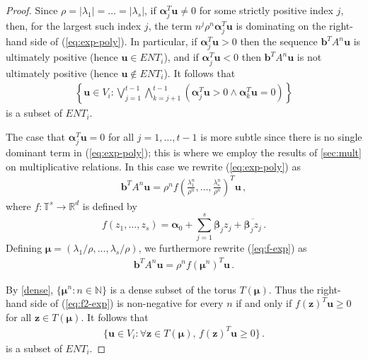 \begin{proof}
Since $\rho=|\lambda_1|=\ldots=|\lambda_s|$, if
$\boldsymbol{\alpha}_j^T\boldsymbol{u}\neq 0$ for some strictly
positive index $j$, then, for the largest such index $j$, the term
$n^{j}\rho^n\boldsymbol{\alpha}_{j}^T\boldsymbol{u}$ is
dominating on the right-hand side of (\ref{eq:exp-poly}).  In
particular, if $\boldsymbol{\alpha}_{j}^T\boldsymbol{u}>0$ then the
sequence $\boldsymbol{b}^TA^n\boldsymbol{u}$ is ultimately positive
(hence $\boldsymbol{u}\in \mathit{ENT}_i$), and if
$\boldsymbol{\alpha}_{j}^T\boldsymbol{u}<0$ then
$\boldsymbol{b}^TA^n\boldsymbol{u}$ is not ultimately positive (hence
$\boldsymbol{u}\not\in\mathit{ENT}_i$).  It follows that
\begin{gather}
\left\{ \boldsymbol{u} \in V_i : \bigvee_{j=1}^{t-1}\bigwedge_{k=j+1}^{t-1}
(\boldsymbol{\alpha}_j^T \boldsymbol{u}>0 \wedge
\boldsymbol{\alpha}_k^T \boldsymbol{u}=0) \right\}
\label{eq:ENT1}
\end{gather}
is a subset of $\mathit{ENT}_i$.

The case that $\boldsymbol{\alpha}_j^T\boldsymbol{u}=0$ for all
$j=1,\ldots,t-1$ is more subtle since there is no single dominant term
in (\ref{eq:exp-poly}); this is where we employ the results of
\cref{sec:mult} on multiplicative relations. In this case we
rewrite (\ref{eq:exp-poly}) as
\begin{gather}
\boldsymbol{b}^T A^n \boldsymbol{u} =
 \rho^n f\left(\frac{\lambda^n_1}{\rho^n},\ldots,
               \frac{\lambda^n_s}{\rho^n}\right)^T \boldsymbol{u} \, ,
\label{eq:f-exp}
\end{gather}
where $f:\mathbb{T}^s\rightarrow\mathbb{R}^d$ is defined by
\[f(z_1,\ldots,z_s)=\boldsymbol{\alpha}_0 + \sum_{j=1}^s \boldsymbol{\beta}_jz_j + \overline{\boldsymbol{\beta}_jz_j} \, .\]
Defining $\boldsymbol\mu=(\lambda_1/\rho,\ldots,\lambda_s/\rho)$, we furthermore rewrite (\ref{eq:f-exp}) as
\begin{gather}
\boldsymbol{b}^T A^n \boldsymbol{u} =
    \rho^n f(\boldsymbol\mu^n)^T \boldsymbol{u} \, .
\label{eq:f2-exp}
\end{gather}

By \cref{dense}, $\{ \boldsymbol\mu^n : n \in
\mathbb{N} \}$ is a dense subset of the torus $T(\boldsymbol{\mu})$.
Thus the right-hand side of (\ref{eq:f2-exp}) is non-negative for
every $n$ if and only if $f(\boldsymbol{z})^T\boldsymbol{u}\geq 0$ for
all $\boldsymbol{z}\in T(\boldsymbol{\mu})$.  It follows that
\begin{gather} \big \{ \boldsymbol{u}\in V_i :
\forall \boldsymbol{z}\in T(\boldsymbol{\mu}),\,
                              f(\boldsymbol{z})^T\boldsymbol{u}\geq 0
\big\}\, .
\label{eq:ENT2}
\end{gather}
is a subset of $\mathit{ENT}_i$.


\end{proof}
